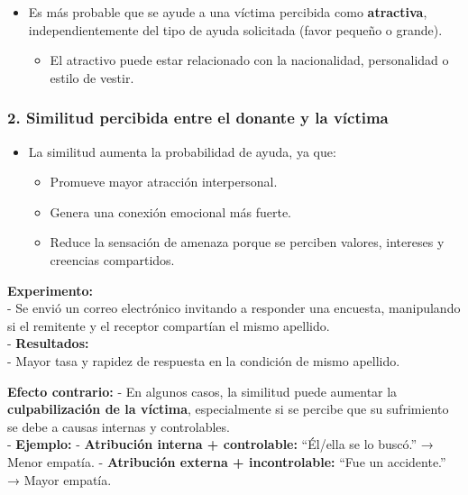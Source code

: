 \documentclass[
]{book}
\providecommand{\tightlist}{%
  \setlength{\itemsep}{0pt}\setlength{\parskip}{0pt}}
\begin{document}
\begin{itemize}
\tightlist
\item
  Es más probable que se ayude a una víctima percibida como \textbf{atractiva}, independientemente del tipo de ayuda solicitada (favor pequeño o grande).

  \begin{itemize}
  \tightlist
  \item
    El atractivo puede estar relacionado con la nacionalidad, personalidad o estilo de vestir.
  \end{itemize}
\end{itemize}

\subsubsection{\texorpdfstring{2. \textbf{Similitud percibida entre el donante y la víctima}}{2. Similitud percibida entre el donante y la víctima}}\label{similitud-percibida-entre-el-donante-y-la-vuxedctima}

\begin{itemize}
\tightlist
\item
  La similitud aumenta la probabilidad de ayuda, ya que:

  \begin{itemize}
  \tightlist
  \item
    Promueve mayor atracción interpersonal.
  \item
    Genera una conexión emocional más fuerte.
  \item
    Reduce la sensación de amenaza porque se perciben valores, intereses y creencias compartidos.
  \end{itemize}
\end{itemize}

\textbf{Experimento:}\\
- Se envió un correo electrónico invitando a responder una encuesta, manipulando si el remitente y el receptor compartían el mismo apellido.\\
- \textbf{Resultados:}\\
- Mayor tasa y rapidez de respuesta en la condición de mismo apellido.

\textbf{Efecto contrario:}
- En algunos casos, la similitud puede aumentar la \textbf{culpabilización de la víctima}, especialmente si se percibe que su sufrimiento se debe a causas internas y controlables.\\
- \textbf{Ejemplo:}
- \textbf{Atribución interna + controlable:} ``Él/ella se lo buscó.'' → Menor empatía.
- \textbf{Atribución externa + incontrolable:} ``Fue un accidente.'' → Mayor empatía.
\end{document}
